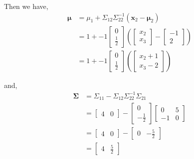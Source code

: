 \documentclass[12pt]{article}\usepackage[]{graphicx}\usepackage[]{color}
\newcommand{\vct}{\mathbf}
\begin{document}
\begin{enumerate}[a)]
Then we have,
\begin{align*}
\vct{\mu} &= \mu_1 + \Sigma_{12}\Sigma_{22}^{-1}(\vct{x}_2 - \vct{\mu}_2)\\
&= 1 + -1 \begin{bmatrix} 0 \\ \frac{1}{2} \end{bmatrix}\left(\begin{bmatrix} x_2 \\ x_3 \end{bmatrix} - \begin{bmatrix} -1 \\ 2 \end{bmatrix}\right)\\
&= 1 + -1 \begin{bmatrix} 0 \\ \frac{1}{2} \end{bmatrix}\left(\begin{bmatrix} x_2 + 1 \\ x_3 - 2 \end{bmatrix}\right)
\end{align*}

and,
\begin{align*}
\vct{\Sigma} &= \Sigma_{11} - \Sigma_{12}\Sigma_{22}^{-1}\Sigma_{21}\\
&= \begin{bmatrix} 4 & 0 \end{bmatrix} - \begin{bmatrix} 0 \\ -\frac{1}{2}\end{bmatrix}\begin{bmatrix} 0 & 5 \\ -1 & 0 \end{bmatrix}\\
&= \begin{bmatrix} 4 & 0 \end{bmatrix} - \begin{bmatrix} 0 & -\frac{5}{2} \end{bmatrix}\\
&= \begin{bmatrix} 4 & \frac{5}{2} \end{bmatrix}
\end{align*}

\end{enumerate} 

\end{document}
